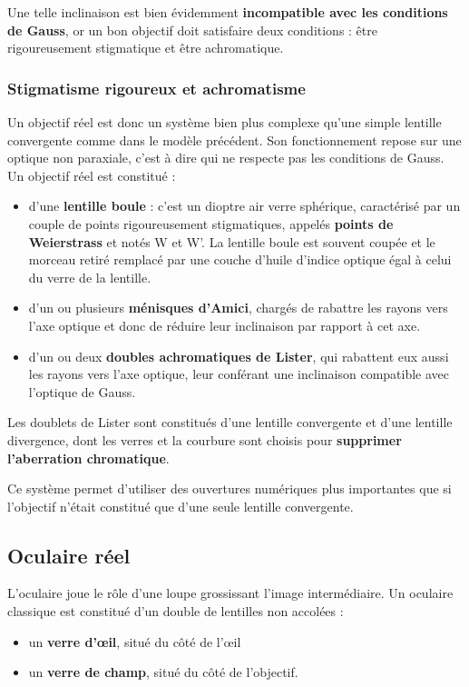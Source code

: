 \documentclass[11pt,a4paper]{report}
\begin{document}
Une telle inclinaison est bien évidemment \textbf{incompatible avec les conditions de Gauss}, or un bon objectif doit satisfaire deux conditions : être rigoureusement stigmatique et être achromatique.\\

\subsubsection{Stigmatisme rigoureux et achromatisme}

Un objectif réel est donc un système bien plus complexe qu'une simple lentille convergente comme dans le modèle précédent. Son fonctionnement repose sur une optique non paraxiale, c'est à dire qui ne respecte pas les conditions de Gauss. Un objectif réel est constitué :\\
\begin{itemize}
	\item d'une \textbf{lentille boule} : c'est un dioptre air verre sphérique, caractérisé par un 				couple de points rigoureusement stigmatiques, appelés \textbf{points de Weierstrass} et notés 		W et W'. La lentille boule est souvent coupée et le morceau retiré remplacé par une couche 				d'huile d'indice optique égal à celui du verre de la lentille.
	\item d'un ou plusieurs \textbf{ménisques d'Amici}, chargés de rabattre les rayons vers l'axe 				optique et donc de réduire leur inclinaison par rapport à cet axe.
	\item d'un ou deux \textbf{doubles achromatiques de Lister}, qui rabattent eux aussi les rayons 			vers l'axe optique, leur conférant une inclinaison compatible avec l'optique de Gauss.\\
\end{itemize}

Les doublets de Lister sont constitués d'une lentille convergente et d'une lentille divergence, dont les verres et la courbure sont choisis pour \textbf{supprimer l'aberration chromatique}.

Ce système permet d'utiliser des ouvertures numériques plus importantes que si l'objectif n'était constitué que d'une seule lentille convergente.

\subsection{Oculaire réel}

L'oculaire joue le rôle d'une loupe grossissant l'image intermédiaire. Un oculaire classique est constitué d'un double de lentilles non accolées :
\begin{itemize}
	\item un \textbf{verre d'œil}, situé du côté de l'œil
	\item un \textbf{verre de champ}, situé du côté de l'objectif.
\end{itemize}
\end{document}
